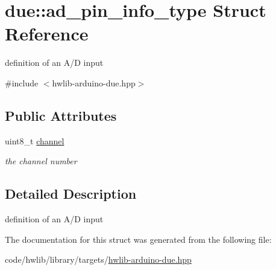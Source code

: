 \hypertarget{structdue_1_1ad__pin__info__type}{}\section{due\+:\+:ad\+\_\+pin\+\_\+info\+\_\+type Struct Reference}
\label{structdue_1_1ad__pin__info__type}


definition of an A/D input  




{\ttfamily \#include $<$hwlib-\/arduino-\/due.\+hpp$>$}

\subsection*{Public Attributes}
\begin{DoxyCompactItemize}
\item 
\mbox{\label{structdue_1_1ad__pin__info__type_ae23ba2025e81198f877ccaaa5927a368}} 
uint8\+\_\+t \hyperlink{structdue_1_1ad__pin__info__type_ae23ba2025e81198f877ccaaa5927a368}{channel}
\begin{DoxyCompactList}\small\item\em the channel number \end{DoxyCompactList}\end{DoxyCompactItemize}


\subsection{Detailed Description}
definition of an A/D input 

The documentation for this struct was generated from the following file\+:\begin{DoxyCompactItemize}
\item 
code/hwlib/library/targets/\hyperlink{hwlib-arduino-due_8hpp}{hwlib-\/arduino-\/due.\+hpp}\end{DoxyCompactItemize}
